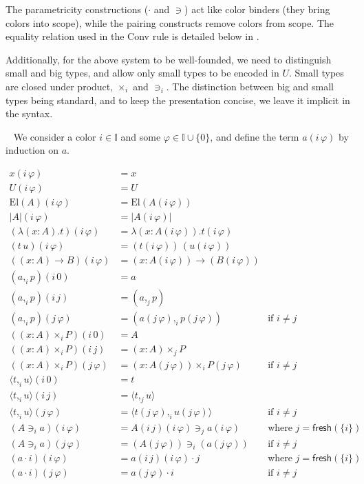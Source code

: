 \documentclass[english]{PaperTools/latex/lipics}
\newcommand\CP[3]{(#2,_{#1} #3)}
\newcommand\CTimes[2]{(#2) ×_{#1}}
\newcommand\op[1]{∋_{#1}}
\newcommand\fp[3]{⟨#2 ,_{#1} #3⟩}
\newcommand\mor[2]{({#1}\,{#2})}
\def\fresh#1{\mathsf{fresh}(#1)}
\def\El#1{\mathrm{El}(#1)}
\begin{document}
The parametricity constructions ($·$ and $∋$) act like color
binders (they bring colors into scope), while the pairing constructs
remove colors from scope.
The equality relation used in the {\sc Conv} rule is detailed below in .

Additionally, for the above system to be well-founded, we need to
distinguish small and big types, and allow only small types to be
encoded in $U$. Small types are closed under product, $×_i$ and
$∋_i$. The distinction between big and small types being standard, and
to keep the presentation concise, we leave it implicit in the syntax.

\begin{definition}~
  \label{def:color-erasure}
  We consider a color $i ∈ 𝕀$ and some $φ ∈ 𝕀 ∪ \{0\}$,
  and define the term $a(i\,φ)$ by induction on $a$.

\begin{align*}
  x \mor{i}{φ} & = x \\
  U \mor{i}{φ} & = U \\
  \El{A} \mor{i}{φ} & = \El {A\mor{i}{φ}} \\
  |A| \mor{i}{φ} & = |A\mor{i}{φ}| \\
  (λ(x:A).t)\mor{i}{φ} &= λ(x:A\mor{i}{φ}).t\mor{i}{φ} \\
  (t\,u)\mor{i}{φ} &= (t\mor{i}{φ}) \, (u\mor{i}{φ}) \\
  ((x:A)→B)\mor{i}{φ} &= (x:A\mor{i}{φ})→(B\mor{i}{φ}) \\
  {\CP {i} a p}\mor{i}{0} &= a \\
  {\CP {i} a p}\mor{i}{j} &= \CP {j} a p \\
  {\CP {i} a p}\mor{j}{φ} &= \CP {i} {a\mor{j}{φ}} {p\mor{j}{φ}} &\text{if $i ≠ j$} \\
  (\CTimes {i} {x:A} P)\mor{i}{0} &= A \\
  (\CTimes {i} {x:A} P)\mor{i}{j} &= \CTimes {j} {x:A} P \\
  (\CTimes {i} {x:A} P)\mor{j}{φ} &= \CTimes {i} {x:A\mor{j}{φ}} {P\mor{j}{φ}} &\text{if $i ≠ j$} \\
  {\fp {i} t u}\mor{i}{0} &= t \\
  {\fp {i} t u}\mor{i}{j} &= \fp {j} t u \\
  {\fp {i} t u}\mor{j}{φ} &= \fp {i} {t\mor{j}{φ}} {u\mor{j}{φ}} &\text{if $i ≠ j$} \\
  (A \op {i} a)\mor{i}{φ} &= {A\mor{i}{j}\mor{i}{φ}} \op {j} {a\mor{i}{φ}} &\text{where $j = \fresh{\{i\}}$} \\
  (A \op {i} a)\mor{j}{φ} &= (A\mor{j}{φ}) \op {i} (a\mor{j}{φ}) &\text{if $i ≠ j$} \\
%
  (a · i)\mor{i}{φ} &= a \mor{i}{j}\mor{i}{φ} · j &\text{where $j = \fresh{\{i\}}$} \\
  (a · i)\mor{j}{φ} &= a\mor{j}{φ} · i &\text{if $i ≠ j$} \\
  \end{align*}
\end{definition}
\end{document}
